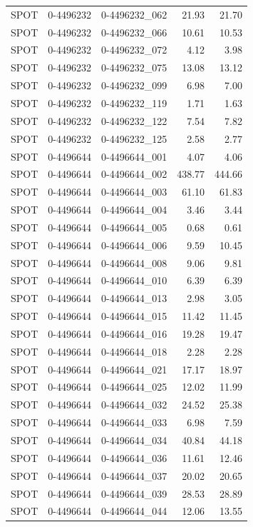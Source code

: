 \begin{tabular}{lllrr}
SPOT & 0-4496232 & 0-4496232_062 & 21.93 & 21.70 \\
SPOT & 0-4496232 & 0-4496232_066 & 10.61 & 10.53 \\
SPOT & 0-4496232 & 0-4496232_072 & 4.12 & 3.98 \\
SPOT & 0-4496232 & 0-4496232_075 & 13.08 & 13.12 \\
SPOT & 0-4496232 & 0-4496232_099 & 6.98 & 7.00 \\
SPOT & 0-4496232 & 0-4496232_119 & 1.71 & 1.63 \\
SPOT & 0-4496232 & 0-4496232_122 & 7.54 & 7.82 \\
SPOT & 0-4496232 & 0-4496232_125 & 2.58 & 2.77 \\
SPOT & 0-4496644 & 0-4496644_001 & 4.07 & 4.06 \\
SPOT & 0-4496644 & 0-4496644_002 & 438.77 & 444.66 \\
SPOT & 0-4496644 & 0-4496644_003 & 61.10 & 61.83 \\
SPOT & 0-4496644 & 0-4496644_004 & 3.46 & 3.44 \\
SPOT & 0-4496644 & 0-4496644_005 & 0.68 & 0.61 \\
SPOT & 0-4496644 & 0-4496644_006 & 9.59 & 10.45 \\
SPOT & 0-4496644 & 0-4496644_008 & 9.06 & 9.81 \\
SPOT & 0-4496644 & 0-4496644_010 & 6.39 & 6.39 \\
SPOT & 0-4496644 & 0-4496644_013 & 2.98 & 3.05 \\
SPOT & 0-4496644 & 0-4496644_015 & 11.42 & 11.45 \\
SPOT & 0-4496644 & 0-4496644_016 & 19.28 & 19.47 \\
SPOT & 0-4496644 & 0-4496644_018 & 2.28 & 2.28 \\
SPOT & 0-4496644 & 0-4496644_021 & 17.17 & 18.97 \\
SPOT & 0-4496644 & 0-4496644_025 & 12.02 & 11.99 \\
SPOT & 0-4496644 & 0-4496644_032 & 24.52 & 25.38 \\
SPOT & 0-4496644 & 0-4496644_033 & 6.98 & 7.59 \\
SPOT & 0-4496644 & 0-4496644_034 & 40.84 & 44.18 \\
SPOT & 0-4496644 & 0-4496644_036 & 11.61 & 12.46 \\
SPOT & 0-4496644 & 0-4496644_037 & 20.02 & 20.65 \\
SPOT & 0-4496644 & 0-4496644_039 & 28.53 & 28.89 \\
SPOT & 0-4496644 & 0-4496644_044 & 12.06 & 13.55 \\

\end{tabular}
